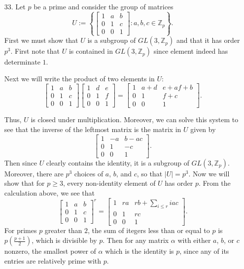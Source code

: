 \documentclass[11pt, reqno]{article}
\theoremstyle{plain}
\theoremstyle{definition}
\theoremstyle{remark}
\newcommand{\ZZ}{\mathbb{Z}}
\begin{document}
\begin{enumerate}
    \item[33.] Let $p$ be a prime and consider the group of matrices 
    \[
        U := \left\{\begin{bmatrix} 1 & a & b \\ 0 & 1 & c \\ 0 & 0 & 1 \end{bmatrix}: a, b, c \in \ZZ_p\right\}.
    \]
    First we must show that $U$ is a subgroup of $GL(3, \ZZ_p)$ and that it has order $p^3$. First note that $U$ is 
    contained in $GL(3, \ZZ_p)$ since element indeed has determinate $1$. 

    Next we will write the product of two elements in $U$: 
    \[
        \begin{bmatrix}1 & a & b \\ 0 & 1 & c \\ 0 & 0 & 1\end{bmatrix}
        \begin{bmatrix}1 & d & e \\ 0 & 1 & f \\ 0 & 0 & 1\end{bmatrix} = 
        \begin{bmatrix} 1 & a + d & e + af + b \\ 0 & 1 & f + c \\ 0 & 0 & 1\end{bmatrix}.
    \]

    Thus, $U$ is closed under multiplication. Moreover, we can solve this system to see that the inverse 
    of the leftmost matrix is the matrix in $U$ given by
    \[
        \begin{bmatrix} 1 & -a & b - ac \\ 0 & 1 & -c \\ 0 & 0 & 1\end{bmatrix}.
    \]
    Then since $U$ clearly contains the identity, it is a subgroup of $GL(3, \ZZ_p)$. Moreover, there are $p^3$ choices
    of $a$, $b$, and $c$, so that $|U| = p^3$.
    \bigbreak
    Now we will show that for $p \geq 3$, every non-identity element of $U$ has order $p$. From the calculation above, we see
    that 
    \[
        \begin{bmatrix}1 & a & b \\ 0 & 1 & c \\ 0 & 0 & 1\end{bmatrix}^r = 
        \begin{bmatrix}1 & ra & rb + \sum\limits_{i \leq r} iac \\ 0 & 1 & rc \\ 0 & 0 & 1\end{bmatrix}.
    \]
    For primes $p$ greater than $2$, the sum of itegers less than or equal to $p$ is $p\left(\frac{p+1}{2}\right)$,
    which is divisible by $p$. Then for any matrix $\alpha$ with either $a$, $b$, or $c$ nonzero, the smallest 
    power of $\alpha$ which is the identity is $p$, since any of its entries are relatively prime with $p$. 


\end{enumerate}
\end{document}
